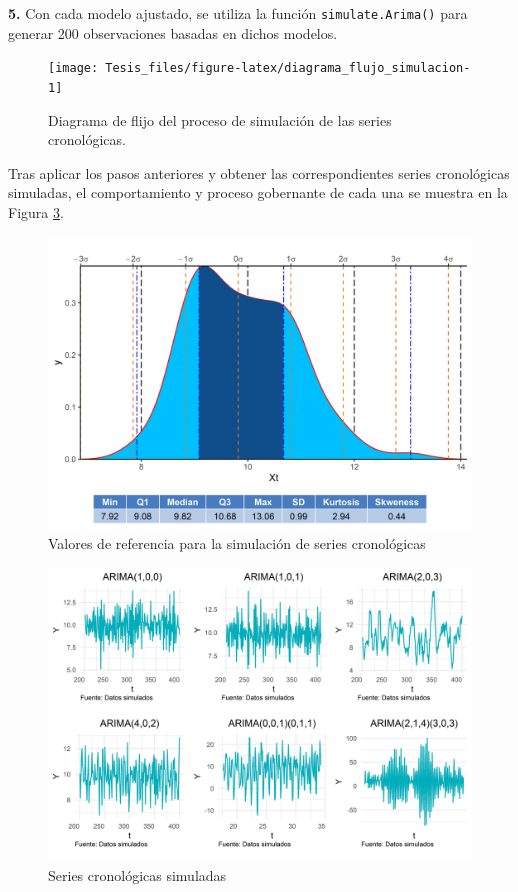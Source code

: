 \documentclass[
]{article}
\begin{document}
\textbf{5.} Con cada modelo ajustado, se utiliza la función
\texttt{simulate.Arima()} para generar 200 observaciones basadas en
dichos modelos.

\begin{figure}[H]
\texttt{[image: Tesis\_files/figure-latex/diagrama\_flujo\_simulacion-1]} \caption{Diagrama de flijo del proceso de simulación de las series cronológicas.}\label{fig:diagrama_flujo_simulacion}
\end{figure}

Tras aplicar los pasos anteriores y obtener las correspondientes series
cronológicas simuladas, el comportamiento y proceso gobernante de cada
una se muestra en la Figura \ref{fig:series_simuladas}.

\begin{figure}[H]
\includegraphics[width=1\linewidth,height=1\textheight]{Tesis_files/figure-latex/datos_simulados-1} \caption{Valores de referencia para la simulación de series cronológicas}\label{fig:datos_simulados}
\end{figure}

\begin{figure}[H]
\includegraphics[width=1\linewidth,height=1\textheight]{Tesis_files/figure-latex/series_simuladas-1} \caption{Series cronológicas simuladas}\label{fig:series_simuladas}
\end{figure}
\end{document}

